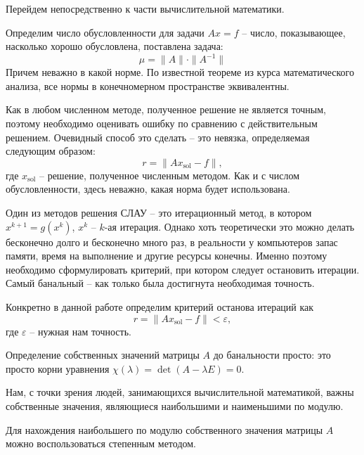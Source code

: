 		
		Перейдем непосредственно к части вычислительной математики. 
		
		Определим число обусловленности для задачи $Ax = f$ -- число, показывающее, насколько хорошо обусловлена, поставлена задача:
		\begin{equation*}
			\mu = \|A\| \cdot \|A^{-1}\|
		\end{equation*}
		Причем неважно в какой норме. По известной теореме из курса математического анализа, все нормы в конечномерном пространстве эквивалентны.
		
		
		Как в любом численном методе, полученное решение не является точным, поэтому необходимо оценивать ошибку по сравнению с действительным решением. Очевидный способ это сделать -- это невязка, определяемая следующим образом:
		\begin{equation*}
			r = \|Ax_\text{sol} - f\|,
		\end{equation*}
		где $x_\text{sol}$ -- решение, полученное численным методом. Как и с числом обусловленности, здесь неважно, какая норма будет использована.
		
		Один из методов решения СЛАУ -- это итерационный метод, в котором $x^{k+1} = g(x^k)$, $x^k$ -- $k$-ая итерация. Однако хоть теоретически это можно делать бесконечно долго и бесконечно много раз, в реальности у компьютеров запас памяти, время на выполнение и другие ресурсы конечны. Именно поэтому необходимо сформулировать критерий, при котором следует остановить итерации. Самый банальный -- как только была достигнута необходимая точность. 
		
		Конкретно в данной работе определим критерий останова итераций как
		\begin{equation*}
			r = \|Ax_\text{sol} - f\| < \varepsilon,
		\end{equation*}
		где $\varepsilon$ -- нужная нам точность.
		
		Определение собственных значений матрицы $A$ до банальности просто: это просто корни уравнения
		$\chi (\lambda) = \det(A - \lambda E) = 0$. 
		
		Нам, с точки зрения людей, занимающихся вычислительной математикой, важны собственные значения, являющиеся наибольшими и наименьшими по модулю.
		
		Для нахождения наибольшего по модулю собственного значения матрицы $A$ можно воспользоваться степенным методом.
		
